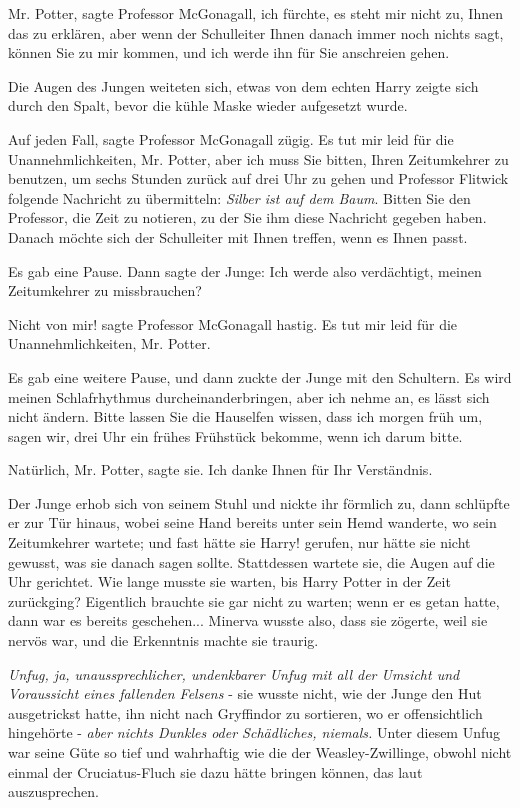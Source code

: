 \glqq{}Mr. Potter\grqq{}, sagte Professor McGonagall, \glqq{}ich fürchte, es steht
mir nicht zu, Ihnen das zu erklären, aber wenn der Schulleiter Ihnen danach
immer noch nichts sagt, können Sie zu mir kommen, und ich werde ihn für Sie
anschreien gehen.\grqq{}

Die Augen des Jungen weiteten sich, etwas von dem echten Harry zeigte sich durch
den Spalt, bevor die kühle Maske wieder aufgesetzt wurde.

\glqq{}Auf jeden Fall\grqq{}, sagte Professor McGonagall zügig. \glqq{}Es tut mir
leid für die Unannehmlichkeiten, Mr. Potter, aber ich muss Sie bitten, Ihren
Zeitumkehrer zu benutzen, um sechs Stunden zurück auf drei Uhr zu gehen und
Professor Flitwick folgende Nachricht zu übermitteln: \emph{Silber ist auf dem
Baum}. Bitten Sie den Professor, die Zeit zu notieren, zu der Sie ihm diese
Nachricht gegeben haben. Danach möchte sich der Schulleiter mit Ihnen treffen,
wenn es Ihnen passt.\grqq{}

Es gab eine Pause. Dann sagte der Junge: \glqq{}Ich werde also verdächtigt,
meinen Zeitumkehrer zu missbrauchen?\grqq{}

\glqq{}Nicht von mir!\grqq{} sagte Professor McGonagall hastig. \glqq{}Es tut mir
leid für die Unannehmlichkeiten, Mr. Potter.\grqq{}

Es gab eine weitere Pause, und dann zuckte der Junge mit den Schultern. \glqq{}Es
wird meinen Schlafrhythmus durcheinanderbringen, aber ich nehme an, es lässt
sich nicht ändern. Bitte lassen Sie die Hauselfen wissen, dass ich morgen früh
um, sagen wir, drei Uhr ein frühes Frühstück bekomme, wenn ich darum
bitte.\grqq{}

\glqq{}Natürlich, Mr. Potter\grqq{}, sagte sie. \glqq{}Ich danke Ihnen für Ihr
Verständnis.\grqq{}

Der Junge erhob sich von seinem Stuhl und nickte ihr förmlich zu, dann schlüpfte
er zur Tür hinaus, wobei seine Hand bereits unter sein Hemd wanderte, wo sein
Zeitumkehrer wartete; und fast hätte sie \glqq{}Harry!\grqq{} gerufen, nur hätte
sie nicht gewusst, was sie danach sagen sollte. Stattdessen wartete sie, die
Augen auf die Uhr gerichtet. Wie lange musste sie warten, bis Harry Potter in
der Zeit zurückging? Eigentlich brauchte sie gar nicht zu warten; wenn er es
getan hatte, dann war es bereits geschehen... Minerva wusste also, dass sie
zögerte, weil sie nervös war, und die Erkenntnis machte sie traurig.

\emph{Unfug, ja, unaussprechlicher, undenkbarer Unfug mit all der Umsicht und
Voraussicht eines fallenden Felsens} - sie wusste nicht, wie der Junge den Hut
ausgetrickst hatte, ihn nicht nach Gryffindor zu sortieren, wo er offensichtlich
hingehörte - \emph{aber nichts Dunkles oder Schädliches, niemals.} Unter diesem
Unfug war seine Güte so tief und wahrhaftig wie die der Weasley-Zwillinge,
obwohl nicht einmal der Cruciatus-Fluch sie dazu hätte bringen können, das laut
auszusprechen.

